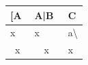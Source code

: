 \begin{tabular}{>{\raggedright\arraybackslash}p{}>{\centering\arraybackslash}p{}>{\raggedleft\arraybackslash}p{}}
\toprule
 {}[A & A|B & C\\
\midrule
x & x & a\textbackslash{}\\
 x  &  x  & x\\
\bottomrule
\end{tabular}

